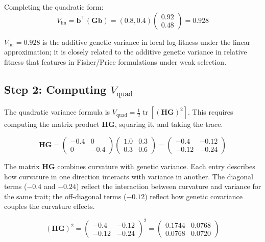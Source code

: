 \documentclass[9pt,twocolumn,twoside,lineno]{gsajnl}
\newcommand{\vect}[1]{\boldsymbol{#1}}
\newcommand{\mat}[1]{\mathbf{#1}}
\newcommand{\tr}{\ensuremath{\operatorname{tr}}\xspace}
\newcommand{\Vlin}{\ensuremath{V_{\text{lin}}}\xspace}
\newcommand{\Vquad}{\ensuremath{V_{\text{quad}}}\xspace}
\begin{document}
Completing the quadratic form:
\begin{equation}
\Vlin = \vect{b}^\top(\mat{G}\vect{b}) = (0.8, 0.4) \begin{pmatrix} 0.92 \\ 0.48 \end{pmatrix} = 0.928
\end{equation}

$\Vlin = 0.928$ is the additive genetic variance in local log-fitness under the linear approximation; it is closely related to the additive genetic variance in relative fitness that features in Fisher/Price formulations under weak selection.

\subsection{Step 2: Computing $\Vquad$}

The quadratic variance formula is $\Vquad = \tfrac{1}{2}\tr[(\mat{H}\mat{G})^2]$. This requires computing the matrix product $\mat{H}\mat{G}$, squaring it, and taking the trace.

\begin{equation}
\mat{H}\mat{G} = \begin{pmatrix} -0.4 & 0 \\ 0 & -0.4 \end{pmatrix} \begin{pmatrix} 1.0 & 0.3 \\ 0.3 & 0.6 \end{pmatrix} = \begin{pmatrix} -0.4 & -0.12 \\ -0.12 & -0.24 \end{pmatrix}
\end{equation}

The matrix $\mat{H}\mat{G}$ combines curvature with genetic variance. Each entry describes how curvature in one direction interacts with variance in another. The diagonal terms ($-0.4$ and $-0.24$) reflect the interaction between curvature and variance for the same trait; the off-diagonal terms ($-0.12$) reflect how genetic covariance couples the curvature effects.

\begin{equation}
(\mat{H}\mat{G})^2 = \begin{pmatrix} -0.4 & -0.12 \\ -0.12 & -0.24 \end{pmatrix}^2 = \begin{pmatrix} 0.1744 & 0.0768 \\ 0.0768 & 0.0720 \end{pmatrix}
\end{equation}
\end{document}
